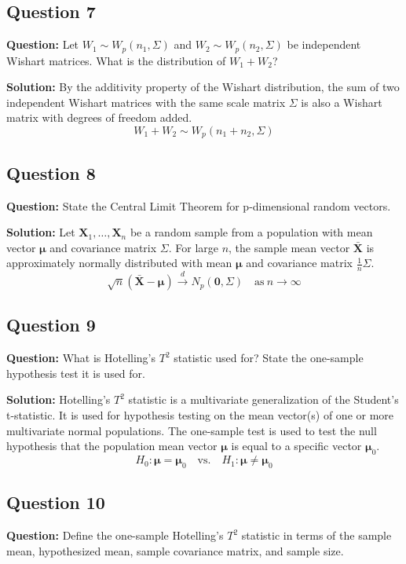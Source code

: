 \subsection*{Question 7}
\textbf{Question:} Let $W_1 \sim W_p(n_1, \Sigma)$ and $W_2 \sim W_p(n_2, \Sigma)$ be independent Wishart matrices. What is the distribution of $W_1 + W_2$?

\textbf{Solution:}
By the additivity property of the Wishart distribution, the sum of two independent Wishart matrices with the same scale matrix $\Sigma$ is also a Wishart matrix with degrees of freedom added.
$$ W_1 + W_2 \sim W_p(n_1 + n_2, \Sigma) $$

\subsection*{Question 8}
\textbf{Question:} State the Central Limit Theorem for p-dimensional random vectors.

\textbf{Solution:}
Let $\mathbf{X}_1, \dots, \mathbf{X}_n$ be a random sample from a population with mean vector $\boldsymbol{\mu}$ and covariance matrix $\Sigma$. For large $n$, the sample mean vector $\bar{\mathbf{X}}$ is approximately normally distributed with mean $\boldsymbol{\mu}$ and covariance matrix $\frac{1}{n}\Sigma$.
$$ \sqrt{n}(\bar{\mathbf{X}} - \boldsymbol{\mu}) \xrightarrow{d} N_p(\mathbf{0}, \Sigma) \quad \text{as} \ n \to \infty $$

\subsection*{Question 9}
\textbf{Question:} What is Hotelling's $T^2$ statistic used for? State the one-sample hypothesis test it is used for.

\textbf{Solution:}
Hotelling's $T^2$ statistic is a multivariate generalization of the Student's t-statistic. It is used for hypothesis testing on the mean vector(s) of one or more multivariate normal populations.
The one-sample test is used to test the null hypothesis that the population mean vector $\boldsymbol{\mu}$ is equal to a specific vector $\boldsymbol{\mu}_0$.
$$ H_0: \boldsymbol{\mu} = \boldsymbol{\mu}_0 \quad \text{vs.} \quad H_1: \boldsymbol{\mu} \neq \boldsymbol{\mu}_0 $$

\subsection*{Question 10}
\textbf{Question:} Define the one-sample Hotelling's $T^2$ statistic in terms of the sample mean, hypothesized mean, sample covariance matrix, and sample size.

